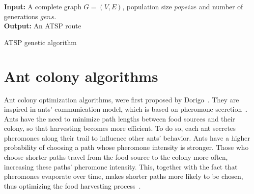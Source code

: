 \begin{algorithm}
  \textbf{Input:} A complete graph $G=(V,E)$, population size $popsize$ and
  number of generations $gens$. \\
  \textbf{Output:} An ATSP route
  \begin{algorithmic}[1]
    \ENDFOR

        \ENDIF
        \ENDIF
      \ENDFOR
      \ENDFOR
    \ENDFOR
      \ENDIF
    \ENDFOR
  \end{algorithmic}
  \caption{ATSP genetic algorithm}
  \label{algorithm:genetic}
\end{algorithm}


\newpage
\section{Ant colony algorithms}
\label{section:ant-colony}

Ant colony optimization algorithms, were first proposed by
Dorigo~\citep{Dorigo1992,Dorigo1996}. They are inspired in ants' communication
model, which is based on pheromone secretion~\citep{Goss1989}. Ants have the need
to minimize path lengths between food sources and their colony, so that
harvesting becomes more efficient. To do so, each ant secretes pheromones along
their trail to influence other ants' behavior. Ants have a higher probability
of choosing a path whose pheromone intensity is stronger. Those who choose
shorter paths travel from the food source to the colony more often, increasing
these paths' pheromone intensity. This, together with the fact that pheromones
evaporate over time, makes shorter paths more likely to be chosen, thus
optimizing the food harvesting process~\citep{Goss1989}.

